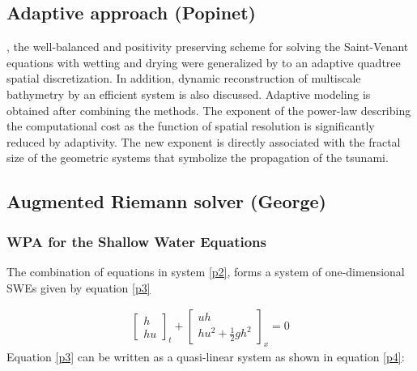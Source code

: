 \documentclass[10pt,a4paper]{article}
\newcommand{\donna}[1]{{\color{red}{#1}}}
\begin{document}
	\subsection{Adaptive approach (Popinet)}
	\donna{Maybe a short section on quadtree adaptivity and the wet/dry approach + }
\citet{audusse2004fast}, the well-balanced and positivity preserving scheme for solving the Saint-Venant equations with wetting and drying were generalized by \cite{popinet2011quadtree} to an adaptive quadtree spatial discretization.  In addition, dynamic reconstruction of multiscale bathymetry by an efficient system is also discussed. Adaptive modeling is obtained after combining the methods. The exponent of the power-law describing the computational cost as the function of spatial resolution is significantly reduced by adaptivity. The new exponent is directly associated with the fractal size of the geometric systems that symbolize the propagation of the tsunami.

	\subsection{Augmented Riemann solver (George)}

	\subsubsection{WPA for the Shallow Water Equations}
	The combination of equations in system \eqref{p2}, forms a system of one-dimensional SWEs given by equation \eqref{p3}
	
	\begin{eqnarray}
		\begin{bmatrix} h \\ hu \end{bmatrix}_t + \begin{bmatrix} uh \\ hu^{2} + \frac{1}{2} gh^{2} \end{bmatrix}_x  = 0 
		\label{p3}
	\end{eqnarray}
	Equation \eqref{p3} can be written as a quasi-linear system as shown in equation \eqref{p4}:
	
\end{document}

